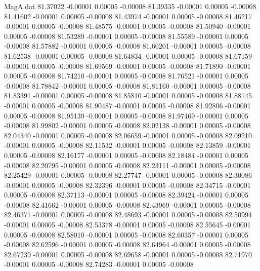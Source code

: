 \begin{filecontents}{MagA.dat}
  81.37022   -0.00001    0.00005   -0.00008
  81.39335   -0.00001    0.00005   -0.00008
  81.41602   -0.00001    0.00005   -0.00008
  81.43974   -0.00001    0.00005   -0.00008
  81.46217   -0.00001    0.00005   -0.00008
  81.48575   -0.00001    0.00005   -0.00008
  81.50940   -0.00001    0.00005   -0.00008
  81.53289   -0.00001    0.00005   -0.00008
  81.55589   -0.00001    0.00005   -0.00008
  81.57882   -0.00001    0.00005   -0.00008
  81.60201   -0.00001    0.00005   -0.00008
  81.62538   -0.00001    0.00005   -0.00008
  81.64834   -0.00001    0.00005   -0.00008
  81.67159   -0.00001    0.00005   -0.00008
  81.69569   -0.00001    0.00005   -0.00008
  81.71890   -0.00001    0.00005   -0.00008
  81.74210   -0.00001    0.00005   -0.00008
  81.76521   -0.00001    0.00005   -0.00008
  81.78842   -0.00001    0.00005   -0.00008
  81.81160   -0.00001    0.00005   -0.00008
  81.83391   -0.00001    0.00005   -0.00008
  81.85810   -0.00001    0.00005   -0.00008
  81.88145   -0.00001    0.00005   -0.00008
  81.90487   -0.00001    0.00005   -0.00008
  81.92806   -0.00001    0.00005   -0.00008
  81.95139   -0.00001    0.00005   -0.00008
  81.97469   -0.00001    0.00005   -0.00008
  81.99802   -0.00001    0.00005   -0.00008
  82.02138   -0.00001    0.00005   -0.00008
  82.04340   -0.00001    0.00005   -0.00008
  82.06659   -0.00001    0.00005   -0.00008
  82.09210   -0.00001    0.00005   -0.00008
  82.11532   -0.00001    0.00005   -0.00008
  82.13859   -0.00001    0.00005   -0.00008
  82.16177   -0.00001    0.00005   -0.00008
  82.18484   -0.00001    0.00005   -0.00008
  82.20795   -0.00001    0.00005   -0.00008
  82.23111   -0.00001    0.00005   -0.00008
  82.25429   -0.00001    0.00005   -0.00008
  82.27747   -0.00001    0.00005   -0.00008
  82.30086   -0.00001    0.00005   -0.00008
  82.32396   -0.00001    0.00005   -0.00008
  82.34715   -0.00001    0.00005   -0.00008
  82.37113   -0.00001    0.00005   -0.00008
  82.39424   -0.00001    0.00005   -0.00008
  82.41662   -0.00001    0.00005   -0.00008
  82.43969   -0.00001    0.00005   -0.00008
  82.46371   -0.00001    0.00005   -0.00008
  82.48693   -0.00001    0.00005   -0.00008
  82.50994   -0.00001    0.00005   -0.00008
  82.53378   -0.00001    0.00005   -0.00008
  82.55645   -0.00001    0.00005   -0.00008
  82.58010   -0.00001    0.00005   -0.00008
  82.60357   -0.00001    0.00005   -0.00008
  82.62596   -0.00001    0.00005   -0.00008
  82.64964   -0.00001    0.00005   -0.00008
  82.67239   -0.00001    0.00005   -0.00008
  82.69658   -0.00001    0.00005   -0.00008
  82.71970   -0.00001    0.00005   -0.00008
  82.74283   -0.00001    0.00005   -0.00008

\end{filecontents}

